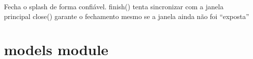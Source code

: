 \documentclass[letterpaper,10pt,english]{sphinxmanual}
\begin{document}
\begin{fulllineitems}
\begin{fulllineitems}
\end{fulllineitems}


\begin{fulllineitems}
\label{\detokenize{api/loading_screen:loading_screen.LoadingScreen.finish_and_close}}
\pysigstartsignatures
\pysiglinewithargsret
{}
{}
{}
\pysigstopsignatures
\sphinxAtStartPar
Fecha o splash de forma confiável.
\sphinxhyphen{} finish() tenta sincronizar com a janela principal
\sphinxhyphen{} close() garante o fechamento mesmo se a janela ainda não foi “exposta”
\begin{quote}\begin{description}
\sphinxAtStartPar
{}

\end{description}\end{quote}

\end{fulllineitems}


\end{fulllineitems}


\sphinxstepscope


\section{models module}
\label{\detokenize{api/models:module-models}}\label{\detokenize{api/models:models-module}}\label{\detokenize{api/models::doc}}
\end{document}
